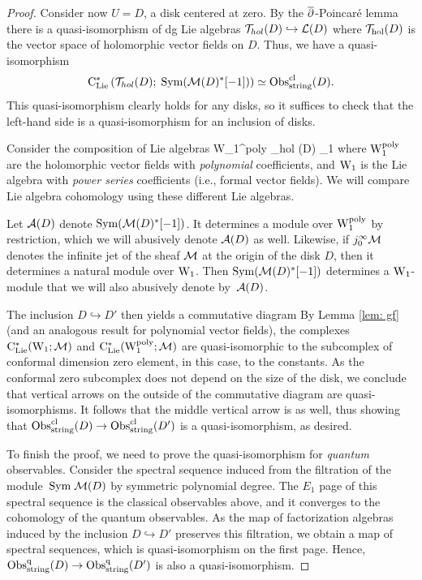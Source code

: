 \begin{proof}
Consider now $U = D$, a disk centered at zero. 
By the $\overline{\partial}$-Poincar\'{e} lemma 
there is a quasi-isomorphism of dg Lie algebras $\mathcal T_{hol}(D) \hookrightarrow \mathcal L(D)$ where $\mathcal T_{\rm hol}(D)$ is the vector space of holomorphic vector fields on $D$. 
Thus, we have a quasi-isomorphism
\[
{\rm C}_{{\rm Lie}}^*\left(\mathcal T_{hol}(D) ; \; {\rm Sym}(\mathcal M(D)^*[-1])\right) \simeq {\rm Obs}^{{\rm cl}}_{\rm string}(D).
\]
This quasi-isomorphism clearly holds for any disks, so it suffices to check that the left-hand side is a quasi-isomorphism for an inclusion of disks.

Consider the composition of Lie algebras
\ben
{\rm W}_1^{\rm poly} \hookrightarrow \cT_{hol} (D) _1
\een
where ${\rm W}_1^{\rm poly}$ are the holomorphic vector fields with {\em polynomial} coefficients, and ${\rm W}_1$ is the Lie algebra with {\em power series} coefficients (i.e., formal vector fields).
We will compare Lie algebra cohomology using these different Lie algebras.

Let $\mathcal{A}(D)$ denote ${\rm Sym}(\mathcal M(D)^*[-1])$.
It determines a module over ${\rm W}_1^{\rm poly}$ by restriction,
which we will abusively denote $\mathcal{A}(D)$ as well.
Likewise, if $j_0^\infty \mathcal M$ denotes the infinite jet of the sheaf $\mathcal M$ at the origin of the disk $D$,
then it determines a natural module over ${\rm W}_1$.
Then ${\rm Sym}(\mathcal M(D)^*[-1])$ determines a ${\rm W}_1$-module that we will also abusively denote by~$\mathcal{A}(D)$.
 
The inclusion $D \hookrightarrow D'$ then yields a commutative diagram
\ben
{}
\een
By Lemma \ref{lem: gf} (and an analogous result for polynomial vector fields),
the complexes ${\rm C}_{{\rm Lie}}^*({\rm W}_1 ; \mathcal M)$ and ${\rm C}_{{\rm Lie}}^*({\rm W}^{\rm poly}_1; \mathcal M)$ are quasi-isomorphic to the subcomplex of conformal dimension zero element, in this case, to the constants. 
As the conformal zero subcomplex does not depend on the size of the disk, we conclude that vertical arrows on the outside of the commutative diagram are quasi-isomorphisms. 
It follows that the middle vertical arrow is as well, 
thus showing that ${\rm Obs}^{{\rm cl}}_{\rm string}(D) \to {\rm Obs}^{{\rm cl}}_{\rm string}(D')$ is a quasi-isomorphism, as desired. 

To finish the proof, we need to prove the quasi-isomorphism for {\em quantum} observables.
Consider the spectral sequence induced from the filtration of the module~${\rm Sym} \;\mathcal M(D)$ by symmetric polynomial degree. 
The $E_1$ page of this spectral sequence is the classical observables above, 
and it converges to the cohomology of the quantum observables. 
As the map of factorization algebras induced by the inclusion $D \hookrightarrow D'$ preserves this filtration, 
we obtain a map of spectral sequences,
which is quasi-isomorphism on the first page.
Hence, ${\rm Obs}^{{\rm q}}_{\rm string}(D) \to {\rm Obs}^{\rm q}_{\rm string}(D')$ is also a quasi-isomorphism. 
\end{proof}

